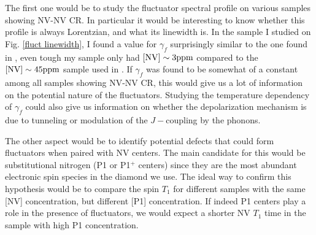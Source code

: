 \documentclass[a4paper,11pt]{report}
\begin{document}
\begin{refsection}
The first one would be to study the fluctuator spectral profile on various samples showing NV-NV CR. In particular it would be interesting to know whether this profile is always Lorentzian, and what its linewidth is. In the sample I studied on Fig. \ref{fluct linewidth}, I found a value for $\gamma_f$ surprisingly similar to the one found in \citep{choi2017depolarization}, even tough my sample only had $[\rm NV] \sim 3 ppm$ compared to the $[\rm NV] \sim 45 ppm$ sample used in \citep{choi2017depolarization}. If $\gamma_f$ was found to be somewhat of a constant among all samples showing NV-NV CR, this would give us a lot of information on the potential nature of the fluctuators. Studying the temperature dependency of $\gamma_f$ could also give us information on whether the depolarization mechanism is due to tunneling or modulation of the $J-$coupling by the phonons.

The other aspect would be to identify potential defects that could form fluctuators when paired with NV centers. The main candidate for this would be substitutional nitrogen (P1 or P1$^+$ centers) since they are the most abundant electronic spin species in the diamond we use. The ideal way to confirm this hypothesis would be to compare the spin $T_1$ for  different samples with the same [NV] concentration, but different [P1] concentration. If indeed P1 centers play a role in the presence of fluctuators, we would expect a shorter NV $T_1$ time in the sample with high P1 concentration.


\printbibliography
\end{refsection}
\end{document}
